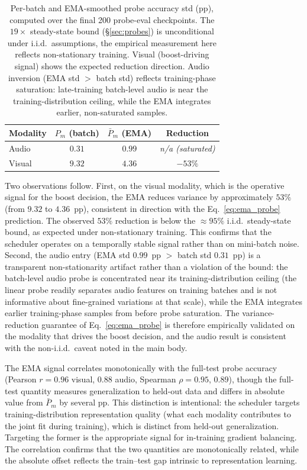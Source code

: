 \documentclass{article}
\begin{document}
\begin{table}[H]
\centering
\caption{Per-batch and EMA-smoothed probe accuracy std (pp), computed over the final 200 probe-eval checkpoints. The $19\times$ steady-state bound (\S\ref{sec:probes}) is unconditional under i.i.d.\ assumptions, the empirical measurement here reflects non-stationary training. Visual (boost-driving signal) shows the expected reduction direction. Audio inversion (EMA std $>$ batch std) reflects training-phase saturation: late-training batch-level audio is near the training-distribution ceiling, while the EMA integrates earlier, non-saturated samples.}
\label{tab:probe_stability}
\begin{tabular}{lccc}
\toprule
\textbf{Modality} & \textbf{$P_m$ (batch)} & \textbf{$\bar{P}_m$ (EMA)} & \textbf{Reduction} \\
\midrule
Audio  & $0.31$ & $0.99$ & \textit{n/a (saturated)} \\
Visual & $9.32$ & $4.36$ & $-53\%$ \\
\bottomrule
\end{tabular}
\end{table}

Two observations follow. First, on the visual modality, which is the operative signal for the boost decision, the EMA reduces variance by approximately $53\%$ (from $9.32$ to $4.36$~pp), consistent in direction with the Eq.~\eqref{eq:ema_probe} prediction. The observed $53\%$ reduction is below the $\approx 95\%$ i.i.d.\ steady-state bound, as expected under non-stationary training. This confirms that the scheduler operates on a temporally stable signal rather than on mini-batch noise. Second, the audio entry (EMA std $0.99$~pp $>$ batch std $0.31$~pp) is a transparent non-stationarity artifact rather than a violation of the bound: the batch-level audio probe is concentrated near its training-distribution ceiling (the linear probe readily separates audio features on training batches and is not informative about fine-grained variations at that scale), while the EMA integrates earlier training-phase samples from before probe saturation. The variance-reduction guarantee of Eq.~\eqref{eq:ema_probe} is therefore empirically validated on the modality that drives the boost decision, and the audio result is consistent with the non-i.i.d.\ caveat noted in the main body.

The EMA signal correlates monotonically with the full-test probe accuracy (Pearson $r=0.96$ visual, $0.88$ audio, Spearman $\rho=0.95$, $0.89$), though the full-test quantity measures generalization to held-out data and differs in absolute value from $\bar{P}_m$ by several pp. This distinction is intentional: the scheduler targets training-distribution representation quality (what each modality contributes to the joint fit during training), which is distinct from held-out generalization. Targeting the former is the appropriate signal for in-training gradient balancing. The correlation confirms that the two quantities are monotonically related, while the absolute offset reflects the train--test gap intrinsic to representation learning.
\end{document}
